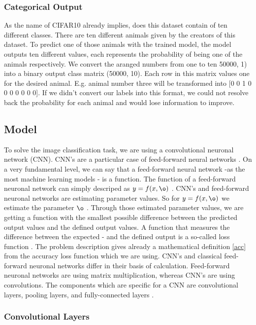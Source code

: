 \documentclass[journal]{IEEEtran}
\begin{document}
\subsubsection{Categorical Output}
As the name of CIFAR10 already implies, does this dataset contain of ten different classes. There are ten different animals given by the creators of this dataset. To predict one of those animals with the trained model, the model outputs ten different values, each represents the probability of being one of the animals respectively. 
We convert the aranged numbers from one to ten 50000, 1) into a binary output class matrix (50000, 10). Each row in this matrix values one for the desired animal. E.g. animal number three will be transformed into [0 0 1 0 0 0 0 0 0 0].
If we didn't convert our labels into this format, we could not resolve back the probability for each animal and would lose information to improve. 

\subsection{Model}
To solve the image classification task, we are using a convolutional neuronal network (CNN). CNN's are a particular case of feed-forward neural networks \cite{Goodfellow-et-al-2016}. On a very fundamental level, we can say that a feed-forward neural network -as the most machine learning models - is a function. The function of a feed-forward neuronal network can simply descriped as \(y = f(x, \o )\) . CNN's and feed-forward neuronal networks are estimating parameter values. So for \(y = f(x, \o )\) we estimate the parameter \(\o \) \cite{Goodfellow-et-al-2016}. Through those estimated parameter values, we are getting a function with the smallest possible difference between the predicted output values and the defined output values. A function that measures the difference between the expected - and the defined output is a so-called loss function \cite{Goodfellow-et-al-2016}. The problem description gives already a mathematical definition \eqref{acc} from the accuracy loss function which we are using. 
CNN's and classical feed-forward neuronal networks differ in their basis of calculation. Feed-forward neuronal networks are using matrix multiplication, whereas CNN's are using convolutions. 
The components which are specific for a CNN are convolutional layers, pooling layers, and fully-connected layers \cite{LeCun1998}. \\
\subsubsection{Convolutional Layers}
\end{document}
